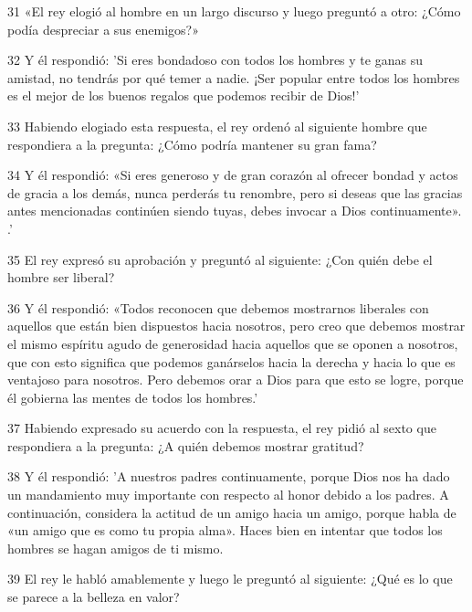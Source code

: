 \par 31 «El rey elogió al hombre en un largo discurso y luego preguntó a otro: ¿Cómo podía despreciar a sus enemigos?»

\par 32 Y él respondió: 'Si eres bondadoso con todos los hombres y te ganas su amistad, no tendrás por qué temer a nadie. ¡Ser popular entre todos los hombres es el mejor de los buenos regalos que podemos recibir de Dios!'

\par 33 Habiendo elogiado esta respuesta, el rey ordenó al siguiente hombre que respondiera a la pregunta: ¿Cómo podría mantener su gran fama?

\par 34 Y él respondió: «Si eres generoso y de gran corazón al ofrecer bondad y actos de gracia a los demás, nunca perderás tu renombre, pero si deseas que las gracias antes mencionadas continúen siendo tuyas, debes invocar a Dios continuamente». .'

\par 35 El rey expresó su aprobación y preguntó al siguiente: ¿Con quién debe el hombre ser liberal?

\par 36 Y él respondió: «Todos reconocen que debemos mostrarnos liberales con aquellos que están bien dispuestos hacia nosotros, pero creo que debemos mostrar el mismo espíritu agudo de generosidad hacia aquellos que se oponen a nosotros, que con esto significa que podemos ganárselos hacia la derecha y hacia lo que es ventajoso para nosotros. Pero debemos orar a Dios para que esto se logre, porque él gobierna las mentes de todos los hombres.'

\par 37 Habiendo expresado su acuerdo con la respuesta, el rey pidió al sexto que respondiera a la pregunta: ¿A quién debemos mostrar gratitud?

\par 38 Y él respondió: 'A nuestros padres continuamente, porque Dios nos ha dado un mandamiento muy importante con respecto al honor debido a los padres. A continuación, considera la actitud de un amigo hacia un amigo, porque habla de «un amigo que es como tu propia alma». Haces bien en intentar que todos los hombres se hagan amigos de ti mismo.

\par 39 El rey le habló amablemente y luego le preguntó al siguiente: ¿Qué es lo que se parece a la belleza en valor?

